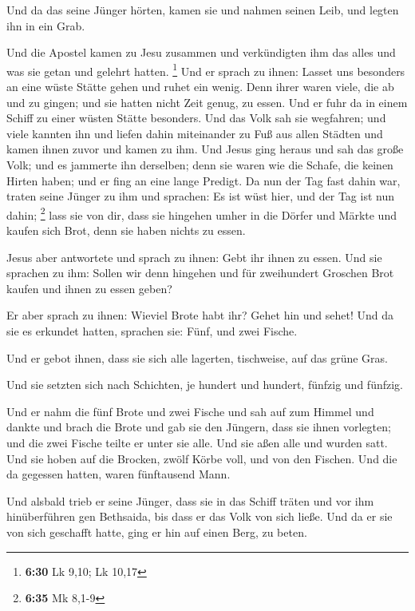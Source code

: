  Und da das seine Jünger hörten, kamen sie und nahmen
seinen Leib, und legten ihn in ein Grab.

 Und die Apostel kamen zu Jesu zusammen und verkündigten
ihm das alles und was sie getan und gelehrt hatten. \footnote{\textbf{6:30}
  Lk 9,10; Lk 10,17}  Und er sprach zu ihnen: Lasset uns
besonders an eine wüste Stätte gehen und ruhet ein wenig. Denn ihrer
waren viele, die ab und zu gingen; und sie hatten nicht Zeit genug, zu
essen.  Und er fuhr da in einem Schiff zu einer wüsten
Stätte besonders.  Und das Volk sah sie wegfahren; und
viele kannten ihn und liefen dahin miteinander zu Fuß aus allen Städten
und kamen ihnen zuvor und kamen zu ihm.  Und Jesus ging
heraus und sah das große Volk; und es jammerte ihn derselben; denn sie
waren wie die Schafe, die keinen Hirten haben; und er fing an eine lange
Predigt.  Da nun der Tag fast dahin war, traten seine
Jünger zu ihm und sprachen: Es ist wüst hier, und der Tag ist nun dahin;
\footnote{\textbf{6:35} Mk 8,1-9}  lass sie von dir, dass
sie hingehen umher in die Dörfer und Märkte und kaufen sich Brot, denn
sie haben nichts zu essen.

 Jesus aber antwortete und sprach zu ihnen: Gebt ihr
ihnen zu essen. Und sie sprachen zu ihm: Sollen wir denn hingehen und
für zweihundert Groschen Brot kaufen und ihnen zu essen geben?

 Er aber sprach zu ihnen: Wieviel Brote habt ihr? Gehet
hin und sehet! Und da sie es erkundet hatten, sprachen sie: Fünf, und
zwei Fische.

 Und er gebot ihnen, dass sie sich alle lagerten,
tischweise, auf das grüne Gras.

 Und sie setzten sich nach Schichten, je hundert und
hundert, fünfzig und fünfzig.

 Und er nahm die fünf Brote und zwei Fische und sah auf
zum Himmel und dankte und brach die Brote und gab sie den Jüngern, dass
sie ihnen vorlegten; und die zwei Fische teilte er unter sie alle.
 Und sie aßen alle und wurden satt.  Und
sie hoben auf die Brocken, zwölf Körbe voll, und von den Fischen.
 Und die da gegessen hatten, waren fünftausend Mann.

 Und alsbald trieb er seine Jünger, dass sie in das
Schiff träten und vor ihm hinüberführen gen Bethsaida, bis dass er das
Volk von sich ließe.  Und da er sie von sich geschafft
hatte, ging er hin auf einen Berg, zu beten.

